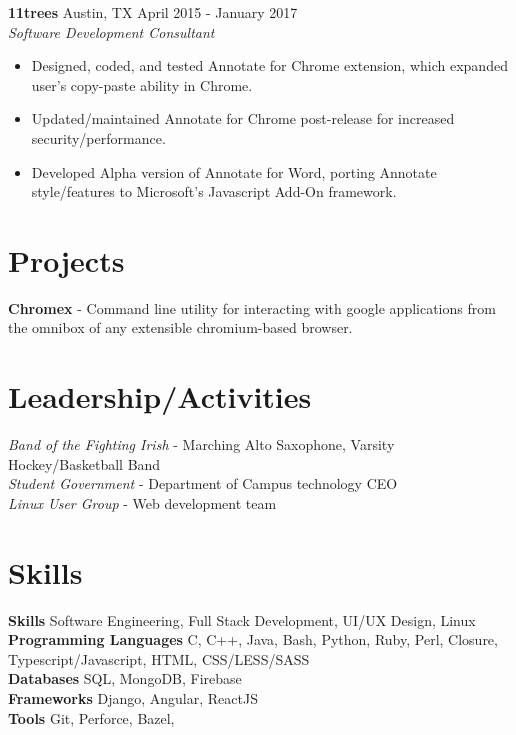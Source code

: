 \documentclass[10pt]{article}
\begin{document}
    \textbf{11trees}
    \hfill
    Austin, TX
    \hfill
    April 2015 - January 2017
    \\
    \textit{Software Development Consultant}
    \begin{itemize}
      \item Designed, coded, and tested Annotate for Chrome extension, which expanded user's copy-paste ability in Chrome.
      \item Updated/maintained Annotate for Chrome post-release for increased security/performance.
      \item Developed Alpha version of Annotate for Word, porting Annotate style/features to Microsoft's Javascript Add-On framework.
    \end{itemize}
 

  \section*{Projects}
    \textbf{Chromex} - Command line utility for interacting with google applications from the omnibox of any extensible chromium-based browser.

  \section*{Leadership/Activities}
    \textit{Band of the Fighting Irish}
    -
    Marching Alto Saxophone, Varsity Hockey/Basketball Band
    \\
    \textit{Student Government}
    -
    Department of Campus technology CEO
    \\
    \textit{Linux User Group}
    -
    Web development team
  \section*{Skills}
    \textbf{Skills}
    Software Engineering,
    Full Stack Development,
    UI/UX Design,
    Linux
    \\
    \textbf{Programming Languages}
    C,
    C++,
    Java,
    Bash,
    Python,
    Ruby,
    Perl,
    Closure,
    Typescript/Javascript,
    HTML,
    CSS/LESS/SASS
    \\
    \textbf{Databases}
    SQL,
    MongoDB,
    Firebase
    \\
    \textbf{Frameworks}
    Django,
    Angular,
    ReactJS
    \\
    \textbf{Tools}
    Git,
    Perforce,
    Bazel,
    \\
\end{document}
